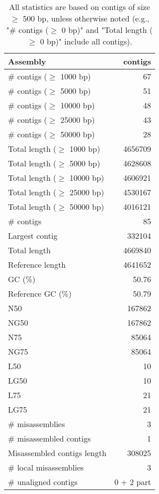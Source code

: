 \documentclass[12pt,a4paper]{article}
\begin{document}
\begin{table}[ht]
\begin{center}
\caption{All statistics are based on contigs of size $\geq$ 500 bp, unless otherwise noted (e.g., "\# contigs ($\geq$ 0 bp)" and "Total length ($\geq$ 0 bp)" include all contigs).}
\begin{tabular}{|l*{1}{|r}|}
\hline
Assembly & contigs \\ \hline
\# contigs ($\geq$ 1000 bp) & 67 \\ \hline
\# contigs ($\geq$ 5000 bp) & 51 \\ \hline
\# contigs ($\geq$ 10000 bp) & 48 \\ \hline
\# contigs ($\geq$ 25000 bp) & 43 \\ \hline
\# contigs ($\geq$ 50000 bp) & 28 \\ \hline
Total length ($\geq$ 1000 bp) & 4656709 \\ \hline
Total length ($\geq$ 5000 bp) & 4628608 \\ \hline
Total length ($\geq$ 10000 bp) & 4606921 \\ \hline
Total length ($\geq$ 25000 bp) & 4530167 \\ \hline
Total length ($\geq$ 50000 bp) & 4016121 \\ \hline
\# contigs & 85 \\ \hline
Largest contig & 332104 \\ \hline
Total length & 4669840 \\ \hline
Reference length & 4641652 \\ \hline
GC (\%) & 50.76 \\ \hline
Reference GC (\%) & 50.79 \\ \hline
N50 & 167862 \\ \hline
NG50 & 167862 \\ \hline
N75 & 85064 \\ \hline
NG75 & 85064 \\ \hline
L50 & 10 \\ \hline
LG50 & 10 \\ \hline
L75 & 21 \\ \hline
LG75 & 21 \\ \hline
\# misassemblies & 3 \\ \hline
\# misassembled contigs & 1 \\ \hline
Misassembled contigs length & 308025 \\ \hline
\# local misassemblies & 3 \\ \hline
\# unaligned contigs & 0 + 2 part \\ \hline

\end{tabular}
\end{center}
\end{table}
\end{document}
